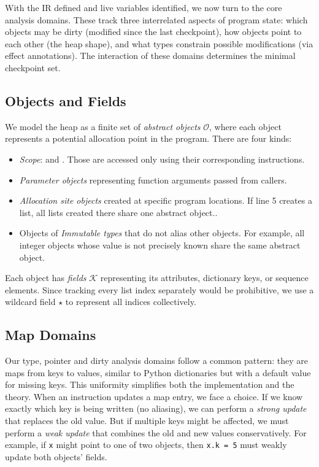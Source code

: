 With the IR defined and live variables identified, we now turn to the core analysis domains. These track three interrelated aspects of program state: which objects may be dirty (modified since the last checkpoint), how objects point to each other (the heap shape), and what types constrain possible modifications (via effect annotations). The interaction of these domains determines the minimal checkpoint set.

\subsection{Objects and Fields}
We model the heap as a finite set of \emph{abstract objects} $\mathcal{O}$, where each object represents a potential allocation point in the program. There are four kinds:
\begin{itemize}
    \item \emph{Scope}: \tLOCALS and \tGLOBALS. Those are accessed only using their corresponding instructions.
    \item \emph{Parameter objects} representing function arguments passed from callers.
    \item \emph{Allocation site objects} created at specific program locations. If line 5 creates a list, all lists created there share one abstract object..
    \item Objects of \emph{Immutable types} that do not alias other objects. For example, all integer objects whose value is not precisely known share the same abstract object.
\end{itemize}
Each object has \emph{fields} $\mathcal{K}$ representing its attributes, dictionary keys, or sequence elements. Since tracking every list index separately would be prohibitive, we use a wildcard field $\star$ to represent all indices collectively.

\subsection{Map Domains}
Our type, pointer and dirty analysis domains follow a common pattern: they are maps from keys to values, similar to Python dictionaries but with a default value for missing keys. This uniformity simplifies both the implementation and the theory.
When an instruction updates a map entry, we face a choice. If we know exactly which key is being written (no aliasing), we can perform a \emph{strong update} that replaces the old value. But if multiple keys might be affected, we must perform a \emph{weak update} that combines the old and new values conservatively. For example, if \texttt{x} might point to one of two objects, then \texttt{x.k = 5} must weakly update both objects' fields.

